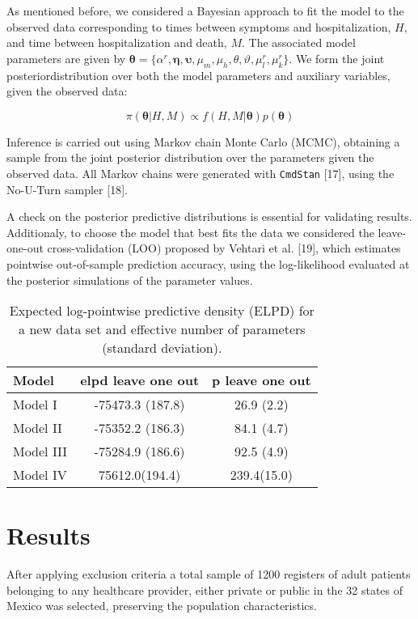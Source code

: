 \documentclass[10pt,letterpaper]{article}
\begin{document}
As mentioned before, we considered a Bayesian approach to fit the model
to the observed data corresponding to times between symptoms and
hospitalization, \(H\), and time between hospitalization and death,
\(M\). The associated model parameters are given by
\(\bm{\theta}=\{\alpha^r,\mathbf{\eta},\mathbf{\upsilon},\mu_m,\mu_h,\theta,\vartheta,\mu^r_l,\mu^r_k\}\).
We form the joint posteriordistribution over both the model parameters
and auxiliary variables, given the observed data:

\[
\pi(\bm{\theta}|H,M)\propto f(H,M|\bm{\theta})p(\bm{\theta})
\]

Inference is carried out using Markov chain Monte Carlo (MCMC),
obtaining a sample from the joint posterior distribution over the
parameters given the observed data. All Markov chains were generated
with \texttt{CmdStan} {[}17{]}, using the No-U-Turn sampler {[}18{]}.

A check on the posterior predictive distributions is essential for
validating results. Additionaly, to choose the model that best fits the
data we considered the leave-one-out cross-validation (LOO) proposed by
Vehtari et al. {[}19{]}, which estimates pointwise out-of-sample
prediction accuracy, using the log-likelihood evaluated at the posterior
simulations of the parameter values.

\begin{table}[!htb]
\centering
\begin{tabular}{lcc}
\hline
{\textbf{Model}} & {\textbf{elpd leave one out}} & {\textbf{p leave one out}} \\
\hline Model I  &  -75473.3 (187.8) & 26.9 (2.2) \\
Model II          &   -75352.2 (186.3) &  84.1 (4.7)\\
Model III         &    -75284.9 (186.6) &  92.5 (4.9)  \\
Model IV & 75612.0(194.4) & 239.4(15.0) \\
\hline
\end{tabular}
\caption{\label{tab:gof} Expected log-pointwise predictive density (ELPD) for a new data set and effective number of parameters (standard deviation).}
\end{table}

\hypertarget{results}{%
\section{Results}\label{results}}

After applying exclusion criteria a total sample of 1200 registers of
adult patients belonging to any healthcare provider, either private or
public in the 32 states of Mexico was selected, preserving the
population characteristics.
\end{document}

